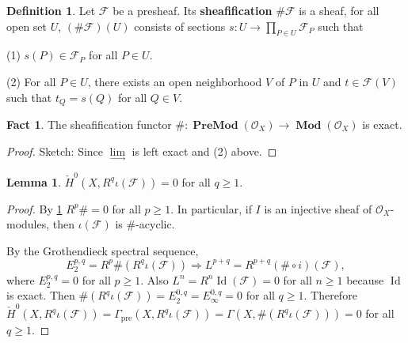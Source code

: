 \documentclass{amsart}
\numberwithin{equation}{section}
\theoremstyle{plain}
\theoremstyle{definition}
\newtheorem{lem}[equation]{Lemma}
\newtheorem{defn}[equation]{Definition}
\newtheorem{fact}[equation]{Fact}
\DeclareMathOperator{\Ab}{\mathbf{Ab}}
\DeclareMathOperator{\Id}{Id}
\DeclareMathOperator{\Mod}{\mathbf{Mod}}
\DeclareMathOperator{\Pre}{pre}
\DeclareMathOperator{\PreAb}{\mathbf{PreAb}}
\DeclareMathOperator{\PreMod}{\mathbf{PreMod}}
\begin{document}
\begin{defn}
	Let $ \mathscr F $ be a presheaf. 
	Its \textbf{sheafification} $ \#\mathscr F $ is a sheaf, for all open set $ U $, $ (\#\mathscr F)(U) $ consists of sections $ s:U\to \prod\limits_{P\in U}\mathscr F_P$  such that 
	
	(1) $ s(P)\in \mathscr F_P $ for all $ P\in U $. 
	
	(2) For all $ P\in U $, there exists an open neighborhood $ V $ of $ P $ in $ U $ and $ t\in \mathscr F(V) $ such that $ t_Q=s(Q) $ for all $ Q\in V $. 
\end{defn}

\begin{fact}\label{3.13}
	The sheafification functor $ \#:\PreMod(\mathcal O_X)\to \Mod(\mathcal O_X) $ is exact. 
\end{fact}

\begin{proof}
	Sketch: Since $ \lim\limits_{\longrightarrow} $ is left exact and (2) above.
%	
\end{proof}

\begin{lem}\label{3.8}
	$ \check{H}^0(X, R^q\iota (\mathscr F))=0 $ for all $ q\ge 1 $. 
\end{lem}

\begin{proof}
	By \cref{3.13} $ R^p\#=0 $ for all $ p\ge 1 $. 
	In particular, if $ I $ is an injective sheaf of $ \mathcal O_X $-modules, then $ \iota(\mathscr F) $ is $ \# $-acyclic. 
	
	By the Grothendieck spectral sequence, $$ E_2^{p,q}=R^p\#(R^q\iota (\mathscr F))\Rightarrow L^{p+q}=R^{p+q}(\#\circ i)(\mathscr F), $$
	where $ E_2^{p,q}= 0$ for all $ p\ge 1 $. 
	Also $ L^n =R^{n}\Id(\mathscr F) =0$ for all $ n\ge 1 $ because $ \Id $ is exact. 
	Then $ \#(R^q\iota (\mathscr F))=E_2^{0,q}=E_{\infty}^{0,q}=0$ for all $ q\ge 1 $. 
	Therefore $ \check{H}^0(X, R^q\iota (\mathscr F))=\Gamma_{\Pre}(X, R^q\iota (\mathscr F))=\Gamma(X, \#(R^q\iota (\mathscr F)))=0 $ for all $ q\ge 1 $. 
\end{proof}
\end{document}
